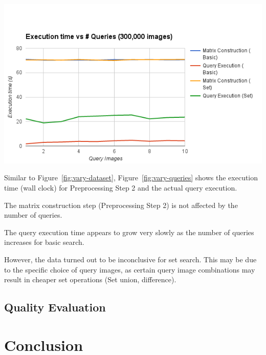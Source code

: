 \begin{minipage}{1.0\columnwidth}
    \centering
    \includegraphics[width=0.9\columnwidth]{figs/vary-queries}
    \label{fig:vary-queries}
\end{minipage}

Similar to Figure~\ref{fig:vary-dataset}, Figure~\ref{fig:vary-queries} shows the execution time (wall clock) for Preprocessing Step 2 and the actual query execution.

The matrix construction step (Preprocessing Step 2) is not affected by the number of queries.

The query execution time appears to grow very slowly as the number of queries increases for basic search.

However, the data turned out to be inconclusive for set search. This may be due to the specific choice of query images, as
certain query image combinations may result in cheaper set operations (Set union, difference).
\subsection{Quality Evaluation}

\section{Conclusion}
